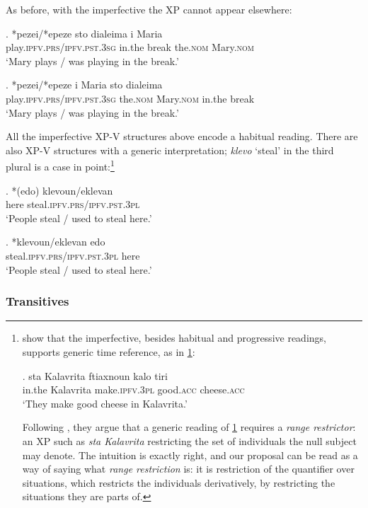 \documentclass[11pt]{article}
\newcommand{\ipfv}{\textsc{ipfv}\xspace}
\begin{document}
As before, with the imperfective the XP cannot appear elsewhere:

\exg. *pezei/*epeze sto dialeima i Maria\\
play.\ipfv.\textsc{prs}/\ipfv.\textsc{pst}.3\textsc{sg} in.the break the.\textsc{nom} Mary.\textsc{nom}\\ \label{unergative61}
`Mary plays / was playing in the break.'

\exg. *pezei/*epeze i Maria sto dialeima\\
play.\ipfv.\textsc{prs}/\ipfv.\textsc{pst}.3\textsc{sg} the.\textsc{nom} Mary.\textsc{nom} in.the break\\ \label{unergative62}
`Mary plays / was playing in the break.'

All the imperfective XP-V structures above encode a habitual reading.  There are also XP-V structures with a generic interpretation; \emph{klevo} `steal' in the third plural is a case in point:\footnote{\citet{spyropoulos-philippaki:01} show that the imperfective, besides habitual and progressive readings, supports generic time reference, as in \ref{spyropoulos2}:

\exg. sta Kalavrita ftiaxnoun kalo tiri\\
in.the Kalavrita make.\ipfv.3\textsc{pl} good.\textsc{acc} cheese.\textsc{acc}\\ \label{spyropoulos2}
`They make good cheese in Kalavrita.'

\noindent Following \citet{cardinaletti-starke:99}, they argue that a generic reading of \ref{spyropoulos2} requires a \emph{range restrictor}: an XP such as \emph{sta Kalavrita} restricting the set of individuals the null subject may denote.  The intuition is exactly right, and our proposal can be read as a way of saying what \emph{range restriction} is: it is restriction of the quantifier over situations, which restricts the individuals derivatively, by restricting the situations they are parts of.}

\exg. *(edo) klevoun/eklevan\\
here steal.\ipfv.\textsc{prs}/\ipfv.\textsc{pst}.3\textsc{pl}\\ \label{gen1}
`People steal / used to steal here.'

\exg. *klevoun/eklevan edo\\
steal.\ipfv.\textsc{prs}/\ipfv.\textsc{pst}.3\textsc{pl} here\\ \label{gen2}
`People steal / used to steal here.'

\subsubsection{Transitives}
\end{document}
